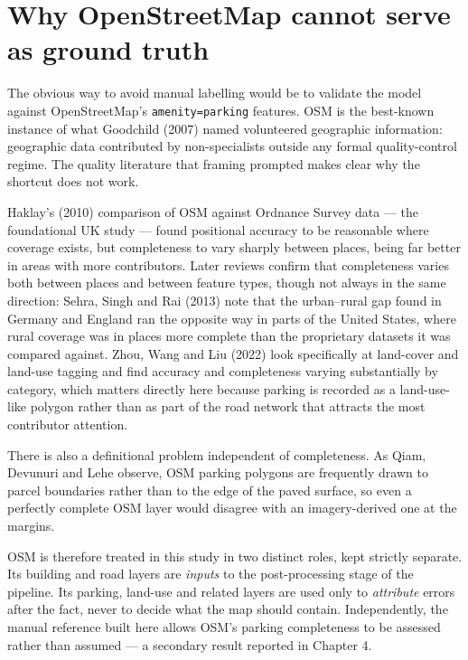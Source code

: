 \hypertarget{why-openstreetmap-cannot-serve-as-ground-truth}{%
\section{Why OpenStreetMap cannot serve as ground truth}\label{why-openstreetmap-cannot-serve-as-ground-truth}}

The obvious way to avoid manual labelling would be to validate the model against OpenStreetMap's \texttt{amenity=parking} features. OSM is the best-known instance of what Goodchild (2007) named volunteered geographic information: geographic data contributed by non-specialists outside any formal quality-control regime. The quality literature that framing prompted makes clear why the shortcut does not work.

Haklay's (2010) comparison of OSM against Ordnance Survey data --- the foundational UK study --- found positional accuracy to be reasonable where coverage exists, but completeness to vary sharply between places, being far better in areas with more contributors. Later reviews confirm that completeness varies both between places and between feature types, though not always in the same direction: Sehra, Singh and Rai (2013) note that the urban--rural gap found in Germany and England ran the opposite way in parts of the United States, where rural coverage was in places more complete than the proprietary datasets it was compared against. Zhou, Wang and Liu (2022) look specifically at land-cover and land-use tagging and find accuracy and completeness varying substantially by category, which matters directly here because parking is recorded as a land-use-like polygon rather than as part of the road network that attracts the most contributor attention.

There is also a definitional problem independent of completeness. As Qiam, Devunuri and Lehe observe, OSM parking polygons are frequently drawn to parcel boundaries rather than to the edge of the paved surface, so even a perfectly complete OSM layer would disagree with an imagery-derived one at the margins.

OSM is therefore treated in this study in two distinct roles, kept strictly separate. Its building and road layers are \emph{inputs} to the post-processing stage of the pipeline. Its parking, land-use and related layers are used only to \emph{attribute} errors after the fact, never to decide what the map should contain. Independently, the manual reference built here allows OSM's parking completeness to be assessed rather than assumed --- a secondary result reported in Chapter 4.

